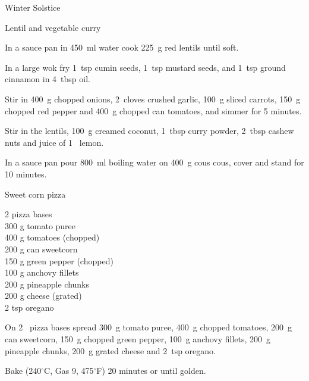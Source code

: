 \begin{menu}{Winter Solstice}
\begin{recipe}{2}{Lentil and vegetable curry}
\begin{ingredients}
		\end{ingredients}
	
	
    \begin{instructions}
    \item 
        In a sauce pan in
        450~ml  water
        cook
        225~g  red lentils
        until soft.
      \item 
        In a large wok fry
        1~tsp  cumin seeds,
        1~tsp  mustard seeds,
        and
        1~tsp  ground cinnamon
        in
        4~tbsp  oil.
      \item 
        Stir in
        400~g chopped onions,
        2~cloves crushed garlic,
        100~g sliced carrots,
        150~g chopped red pepper
        and
        400~g chopped can tomatoes,
        and simmer for 5 minutes.
      \item 
        Stir in
        the lentils,
        100~g  creamed coconut,
        1~tbsp  curry powder,
        2~tbsp  cashew nuts
        and juice of
        1~  lemon.
      \item 
      In a
      sauce pan pour 800~ml  boiling water
      on 400~g  cous cous, cover and
      stand for 10 minutes.
    
    \end{instructions}
    \end{recipe}%
  
    \begin{recipe}{2}{Sweet corn pizza}%
    
		\begin{ingredients}
		2  pizza bases  \\
	300 g tomato puree  \\
	400 g tomatoes (chopped) \\
	200 g can sweetcorn  \\
	150 g green pepper (chopped) \\
	100 g anchovy fillets  \\
	200 g pineapple chunks  \\
	200 g cheese (grated) \\
	2 tsp oregano  \\
	
		\end{ingredients}
	
	
    \begin{instructions}
    \item 
        On
        2~  pizza bases
        spread
        300~g  tomato puree,
        400~g chopped tomatoes,
        200~g  can sweetcorn,
        150~g chopped green pepper,
        100~g  anchovy fillets,
        200~g  pineapple chunks,
        200~g grated cheese
        and
        2~tsp  oregano.
      \item 
        Bake 
      (240$^{\circ}$C, Gas 9, 475$^{\circ}$F)
     20 minutes or until golden.
      

\end{instructions}
\end{recipe}
\end{menu}
